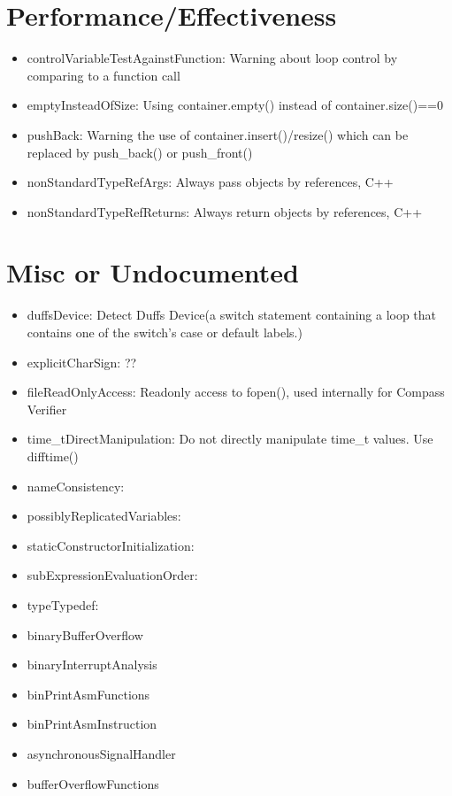 \section{Performance/Effectiveness}
\begin{itemize}
\item controlVariableTestAgainstFunction: Warning about loop control by comparing to a function call
\item emptyInsteadOfSize: Using container.empty() instead of container.size()==0  
\item pushBack: Warning the use of container.insert()/resize() which can be
replaced by push\_back() or push\_front()
\item nonStandardTypeRefArgs: Always pass objects by references, C++
\item nonStandardTypeRefReturns: Always return objects by references, C++ 
\end{itemize}

\section{Misc or Undocumented}
\begin{itemize}
\item duffsDevice: Detect Duffs Device(a switch statement containing a loop that contains one of the switch's case or default labels.)
\item explicitCharSign: ??
\item fileReadOnlyAccess: Readonly access to fopen(), used internally for Compass Verifier
\item time\_tDirectManipulation: Do not directly manipulate time\_t values. Use difftime()
\item nameConsistency: 
\item possiblyReplicatedVariables: 
\item staticConstructorInitialization: 
\item subExpressionEvaluationOrder: 
\item typeTypedef: 
\item binaryBufferOverflow
\item binaryInterruptAnalysis
\item binPrintAsmFunctions
\item binPrintAsmInstruction
\item asynchronousSignalHandler
\item bufferOverflowFunctions
\end{itemize}
